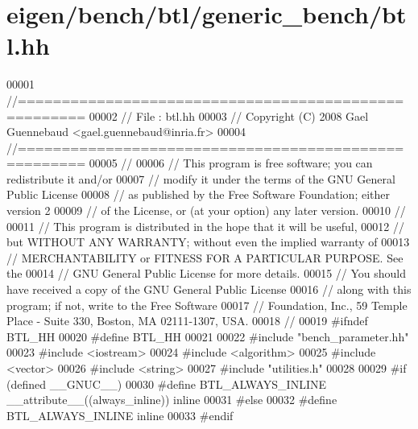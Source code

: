 \hypertarget{eigen_2bench_2btl_2generic__bench_2btl_8hh_source}{}\section{eigen/bench/btl/generic\+\_\+bench/btl.hh}
\label{eigen_2bench_2btl_2generic__bench_2btl_8hh_source}

\begin{DoxyCode}
00001 \textcolor{comment}{//=====================================================}
00002 \textcolor{comment}{// File   :  btl.hh}
00003 \textcolor{comment}{// Copyright (C) 2008 Gael Guennebaud <gael.guennebaud@inria.fr>}
00004 \textcolor{comment}{//=====================================================}
00005 \textcolor{comment}{//}
00006 \textcolor{comment}{// This program is free software; you can redistribute it and/or}
00007 \textcolor{comment}{// modify it under the terms of the GNU General Public License}
00008 \textcolor{comment}{// as published by the Free Software Foundation; either version 2}
00009 \textcolor{comment}{// of the License, or (at your option) any later version.}
00010 \textcolor{comment}{//}
00011 \textcolor{comment}{// This program is distributed in the hope that it will be useful,}
00012 \textcolor{comment}{// but WITHOUT ANY WARRANTY; without even the implied warranty of}
00013 \textcolor{comment}{// MERCHANTABILITY or FITNESS FOR A PARTICULAR PURPOSE.  See the}
00014 \textcolor{comment}{// GNU General Public License for more details.}
00015 \textcolor{comment}{// You should have received a copy of the GNU General Public License}
00016 \textcolor{comment}{// along with this program; if not, write to the Free Software}
00017 \textcolor{comment}{// Foundation, Inc., 59 Temple Place - Suite 330, Boston, MA  02111-1307, USA.}
00018 \textcolor{comment}{//}
00019 \textcolor{preprocessor}{#ifndef BTL\_HH}
00020 \textcolor{preprocessor}{#define BTL\_HH}
00021 
00022 \textcolor{preprocessor}{#include "bench\_parameter.hh"}
00023 \textcolor{preprocessor}{#include <iostream>}
00024 \textcolor{preprocessor}{#include <algorithm>}
00025 \textcolor{preprocessor}{#include <vector>}
00026 \textcolor{preprocessor}{#include <string>}
00027 \textcolor{preprocessor}{#include "utilities.h"}
00028 
00029 \textcolor{preprocessor}{#if (defined \_\_GNUC\_\_)}
00030 \textcolor{preprocessor}{#define BTL\_ALWAYS\_INLINE \_\_attribute\_\_((always\_inline)) inline}
00031 \textcolor{preprocessor}{#else}
00032 \textcolor{preprocessor}{#define BTL\_ALWAYS\_INLINE inline}
00033 \textcolor{preprocessor}{#endif}

\end{DoxyCode}
